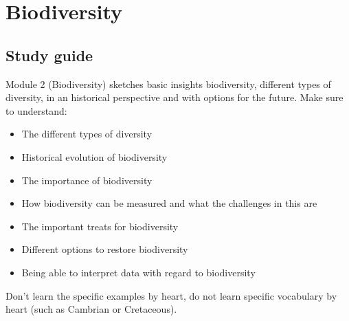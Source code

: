 \documentclass[../summary.tex]{subfiles}
\begin{document}
	
	\section{Biodiversity}
	
	\subsection{Study guide}
	
	Module 2 (Biodiversity) sketches basic insights biodiversity, different types of diversity, in an historical perspective and with options for the future. Make sure to understand:
	\begin{itemize}
		\item The different types of diversity
		\item Historical evolution of biodiversity
		\item The importance of biodiversity
		\item How biodiversity can be measured and what the challenges in this are
		\item The important treats for biodiversity
		\item Different options to restore biodiversity
		\item Being able to interpret data with regard to biodiversity
	\end{itemize} 
	
	Don’t learn the specific examples by heart, do not learn specific vocabulary by heart (such as Cambrian or Cretaceous).
	\\
	
\end{document}
